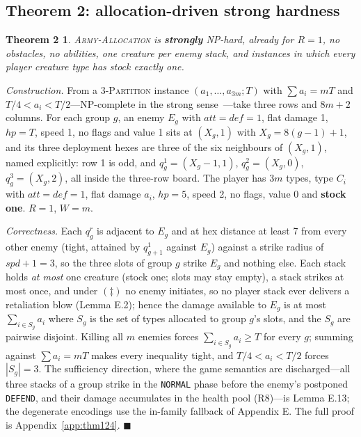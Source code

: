 \documentclass[11pt,a4paper]{article}
\theoremstyle{plain}
\newtheorem*{thmtwo}{Theorem 2}
\theoremstyle{definition}
\theoremstyle{plain}
\theoremstyle{definition}
\theoremstyle{remark}
\newcommand{\ALLOC}{\textsc{Army-Allocation}}
\newcommand{\THREEPART}{\textsc{3-Partition}}
\newcommand{\qedbox}{\hfill$\blacksquare$}
\begin{document}
\subsection{Theorem 2: allocation-driven strong hardness}\label{sec:thm2}

\begin{thmtwo}
\ALLOC{} is \textbf{strongly} NP-hard, already for $R=1$, no obstacles, no abilities, one
creature per enemy stack, and instances in which every \emph{player} creature type has stock
exactly one.
\end{thmtwo}

\smallskip
\noindent\emph{Construction.} From a \THREEPART{} instance $(a_1,\dots,a_{3m};T)$ with
$\sum a_i=mT$ and $T/4<a_i<T/2$---NP-complete in the strong sense~\cite[SP15]{GJ79}---take
three rows and $8m+2$ columns. For each group $g$, an enemy $E_g$ with
$\mathit{att}=\mathit{def}=1$, flat damage 1, $\mathit{hp}=T$, speed 1, no flags and value 1
sits at $(X_g,1)$ with $X_g=8(g-1)+1$, and its three deployment hexes are three of the six
neighbours of $(X_g,1)$, named explicitly: row 1 is odd, and
$q_g^1=(X_g-1,1)$, $q_g^2=(X_g,0)$, $q_g^3=(X_g,2)$, all inside the three-row board. The
player has $3m$ types, type $C_i$ with $\mathit{att}=\mathit{def}=1$, flat damage $a_i$,
$\mathit{hp}=5$, speed 2, no flags, value 0 and \textbf{stock one}. $R=1$, $W=m$.

\smallskip
\noindent\emph{Correctness.} Each $q_g^r$ is adjacent to $E_g$ and at hex distance at least 7
from every other enemy (tight, attained by $q_{g+1}^1$ against $E_g$) against a strike radius
of $\mathit{spd}+1=3$, so the three slots of group $g$ strike $E_g$ and nothing else. Each
stack holds \emph{at most} one creature (stock one; slots may stay empty), a stack strikes at
most once, and under $(\ddagger)$ no enemy initiates, so no player stack ever delivers a
retaliation blow (Lemma E.2); hence the damage available to $E_g$ is at most
$\sum_{i\in S_g}a_i$ where $S_g$ is the set of types allocated to group $g$'s slots, and the
$S_g$ are pairwise disjoint. Killing all $m$ enemies forces $\sum_{i\in S_g}a_i\ge T$ for every
$g$; summing against $\sum a_i=mT$ makes every inequality tight, and $T/4<a_i<T/2$ forces
$|S_g|=3$. The sufficiency direction, where the game semantics are discharged---all three
stacks of a group strike in the \texttt{NORMAL} phase before the enemy's postponed
\texttt{DEFEND}, and their damage accumulates in the health pool (R8)---is Lemma E.13; the
degenerate encodings use the in-family fallback of Appendix E. The full proof is
Appendix~\ref{app:thm124}. \qedbox
\end{document}

